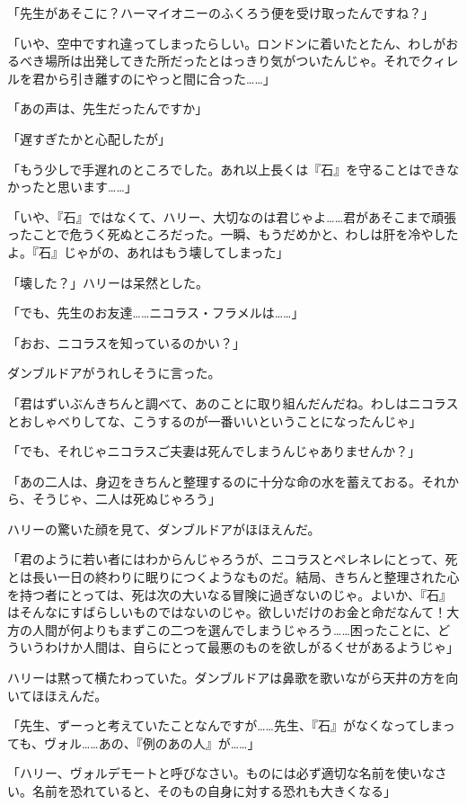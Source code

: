 \documentclass[10pt,a4paper]{article}
\begin{document}
\begin{CJK}{UTF8}{min}
「先生があそこに？ハーマイオニーのふくろう便を受け取ったんですね？」

「いや、空中ですれ違ってしまったらしい。ロンドンに着いたとたん、わしがおるべき場所は出発してきた所だったとはっきり気がついたんじゃ。それでクィレルを君から引き離すのにやっと間に合った……」

「あの声は、先生だったんですか」

「遅すぎたかと心配したが」

「もう少しで手遅れのところでした。あれ以上長くは『石』を守ることはできなかったと思います……」

「いや、『石』ではなくて、ハリー、大切なのは君じゃよ……君があそこまで頑張ったことで危うく死ぬところだった。一瞬、もうだめかと、わしは肝を冷やしたよ。『石』じゃがの、あれはもう壊してしまった」

「壊した？」ハリーは呆然とした。

「でも、先生のお友達……ニコラス・フラメルは……」

「おお、ニコラスを知っているのかい？」

ダンブルドアがうれしそうに言った。

「君はずいぶんきちんと調べて、あのことに取り組んだんだね。わしはニコラスとおしゃべりしてな、こうするのが一番いいということになったんじゃ」

「でも、それじゃニコラスご夫妻は死んでしまうんじゃありませんか？」

「あの二人は、身辺をきちんと整理するのに十分な命の水を蓄えておる。それから、そうじゃ、二人は死ぬじゃろう」

ハリーの驚いた顔を見て、ダンブルドアがほほえんだ。

「君のように若い者にはわからんじゃろうが、ニコラスとペレネレにとって、死とは長い一日の終わりに眠りにつくようなものだ。結局、きちんと整理された心を持つ者にとっては、死は次の大いなる冒険に過ぎないのじゃ。よいか、『石』はそんなにすばらしいものではないのじゃ。欲しいだけのお金と命だなんて！大方の人間が何よりもまずこの二つを選んでしまうじゃろう……困ったことに、どういうわけか人間は、自らにとって最悪のものを欲しがるくせがあるようじゃ」

ハリーは黙って横たわっていた。ダンブルドアは鼻歌を歌いながら天井の方を向いてほほえんだ。

「先生、ずーっと考えていたことなんですが……先生、『石』がなくなってしまっても、ヴォル……あの、『例のあの人』が……」

「ハリー、ヴォルデモートと呼びなさい。ものには必ず適切な名前を使いなさい。名前を恐れていると、そのもの自身に対する恐れも大きくなる」


\end{CJK}
\end{document}
